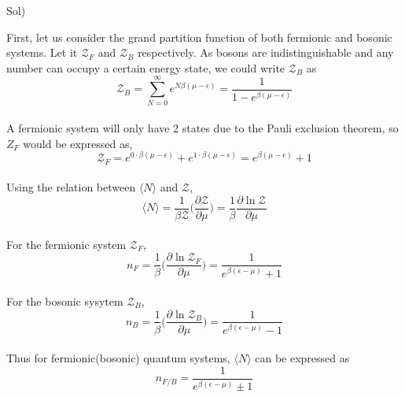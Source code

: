 \documentclass[paper=a4, fontsize=11pt]{scrartcl}
\numberwithin{equation}{section}
\numberwithin{figure}{section}
\numberwithin{table}{section}
\newcommand{\pder}[2]{\frac{\partial #1}{\partial #2}}
\newcommand{\expval}[1]{\langle #1 \rangle}
\newenvironment{solution}{Sol) \begin{adjustwidth}{0.2in}{}\vspace{0.1in}}{\end{adjustwidth}}
\begin{document}
\begin{solution}
	First, let us consider the grand partition function of both fermionic and bosonic systems. Let it $\mathcal{Z}_F$ and $\mathcal{Z}_B$ respectively. As bosons are indistinguishable and any number can occupy a certain energy state, we could write $\mathcal{Z}_B$ as \\[3pt]
	\begin{equation}
		\mathcal{Z}_B = \sum_{N=0}^{\infty} e^{N\beta(\mu-\epsilon)} = \frac{1}{1-e^{\beta(\mu-\epsilon)}}
	\end{equation}\\[3pt]
	A fermionic system will only have 2 states due to the Pauli exclusion theorem, so $Z_F$ would be expressed as, \\[3pt]
	\begin{equation}
		\mathcal{Z}_F = e^{0\cdot\beta(\mu-\epsilon)} + e^{1\cdot\beta(\mu-\epsilon)} = e^{\beta(\mu-\epsilon)} + 1
	\end{equation}\\[3pt]
	Using the relation between $\expval{N}$ and $\mathcal{Z}$,\\[3pt]
	\begin{equation}
		\expval{N} = \frac{1}{\beta\mathcal{Z}}\bigg(\pder{\mathcal{Z}}{\mu}\bigg) = \frac{1}{\beta}\pder{\ln \mathcal{Z}}{\mu}
	\end{equation}\\[3pt]
	For the fermionic system $\mathcal{Z}_F$, \\[3pt]
	\begin{equation}
		n_F = \frac{1}{\beta}\bigg(\pder{\ln \mathcal{Z}_F}{\mu}\bigg) = \frac{1}{e^{\beta(\epsilon-\mu)}+ 1}
	\end{equation} \\[3pt]
	For the bosonic sysytem $\mathcal{Z}_B$, \\[3pt]	
	\begin{equation}
		n_B = \frac{1}{\beta}\bigg(\pder{\ln \mathcal{Z}_B}{\mu}\bigg) = \frac{1}{e^{\beta(\epsilon-\mu)}- 1}
	\end{equation} \\[3pt]
	Thus for fermionic(bosonic) quantum systems, $\expval{N}$ can be expressed as \\[3pt]
	\begin{equation}
		n_{F/B}=\frac{1}{e^{\beta(\epsilon-\mu)}\pm 1}
	\end{equation}
\end{solution}

\vskip 0.75in
\end{document}
